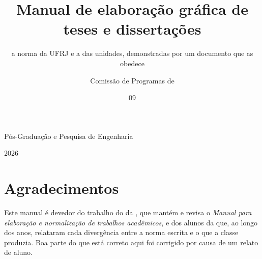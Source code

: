 \documentclass[dsc]{ufrj}
\begin{document}
  \title{Manual de elaboração gráfica de teses e dissertações}
  \subtitle{a norma da UFRJ e a das unidades, demonstradas por um documento que
    as obedece}

  \author{Comissão de Programas de}{Pós-Graduação e Pesquisa de Engenharia}


  \date{09}{2026}



  \maketitle

  \frontmatter

  \dedication{A quem vai depositar a tese na semana que vem.}

  \chapter*{Agradecimentos}

  Este manual é devedor do trabalho do  da , que mantém e
  revisa o \emph{Manual para elaboração e normalização de trabalhos acadêmicos},
  e dos alunos da  que, ao longo dos anos, relataram cada
  divergência entre a norma escrita e o que a classe produzia. Boa parte do que
  está correto aqui foi corrigido por causa de um relato de aluno.
\end{document}
